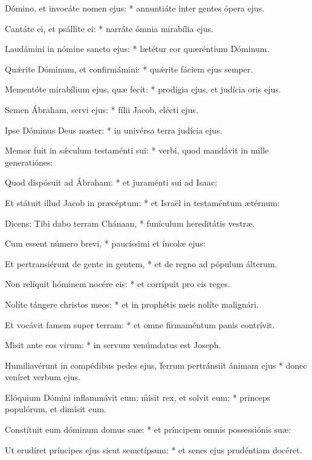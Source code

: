 \begin{psalmus}

 Dómino, et invocáte nomen ejus: * annuntiáte inter gentes ópera ejus.

Cantáte ei, et psállite ei: * narráte ómnia mirabília ejus.

Laudámini in nómine sancto ejus: * lætétur cor quæréntium Dóminum.

Quǽrite Dóminum, et confirmámini: * quǽrite fáciem ejus semper.

Mementóte mirabílium ejus, quæ fecit: * prodígia ejus, et judícia oris ejus.

Semen Ábraham, servi ejus: * fílii Jacob, elécti ejus.

Ipse Dóminus Deus noster: * in univérsa terra judícia ejus.

Memor fuit in sǽculum testaménti sui: * verbi, quod mandávit in mille generatiónes:

Quod dispósuit ad Ábraham: * et juraménti sui ad Isaac:

Et státuit illud Jacob in præcéptum: * et Israël in testaméntum ætérnum:

Dicens: Tibi dabo terram Chánaan, * funículum hereditátis vestræ.

Cum essent número brevi, * paucíssimi et íncolæ ejus:

Et pertransiérunt de gente in gentem, * et de regno ad pópulum álterum.

Non relíquit hóminem nocére eis: * et corrípuit pro eis reges.

Nolíte tángere christos meos: * et in prophétis meis nolíte malignári.

Et vocávit famem super terram: * et omne firmaméntum panis contrívit.

Misit ante eos virum: * in servum venúmdatus est Joseph.

Humiliavérunt in compédibus pedes ejus, \f ferrum pertránsiit ánimam ejus * donec veníret verbum ejus.

Elóquium Dómini inflammávit eum: \f misit rex, et solvit eum; * princeps populórum, et dimísit eum.

Constítuit eum dóminum domus suæ: * et príncipem omnis possessiónis suæ:

Ut erudíret príncipes ejus sicut semetípsum: * et senes ejus prudéntiam docéret.

\end{psalmus}
